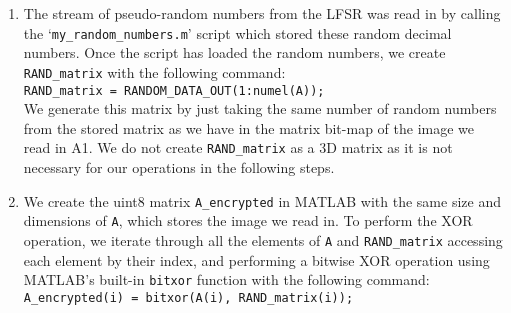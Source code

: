 \begin{enumerate}[wide, label=(B\arabic*)]
\item
The stream of pseudo-random numbers from the LFSR was read in by calling the `\texttt{my\_random\_numbers.m}' script which stored these random decimal numbers. Once the script has loaded the random numbers, we create \texttt{RAND\_matrix} with the following command:\\
\texttt{RAND\_matrix = RANDOM\_DATA\_OUT(1:numel(A));}
\\We generate this matrix by just taking the same number of random numbers from the stored matrix as we have in the matrix bit-map of the image we read in A1. We do not create \texttt{RAND\_matrix} as a 3D matrix as it is not necessary for our operations in the following steps.

\item
We create the uint8 matrix \texttt{A\_encrypted} in MATLAB with the same size and dimensions of \texttt{A}, which stores the image we read in. To perform the XOR operation, we iterate through all the elements of \texttt{A} and \texttt{RAND\_matrix} accessing each element by their index, and performing a bitwise XOR operation using MATLAB's built-in \texttt{bitxor} function with the following command:\\
\texttt{A\_encrypted(i) = bitxor(A(i), RAND\_matrix(i));}


\end{enumerate}
